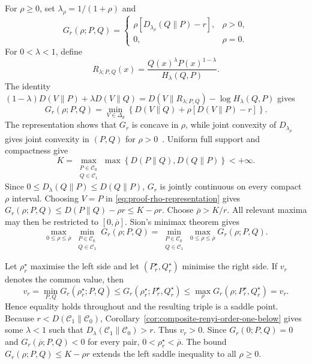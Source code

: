\documentclass[journal,10pt,draftclsnofoot,onecolumn]{IEEEtran}
\begin{document}
\begin{IEEEproof}
For $\rho\geq0$, set $ \lambda_\rho=1/(1+\rho)$ and
\begin{equation*}
G_r(\rho;P,Q)=
\begin{cases}
\rho\left[ D_{\lambda_\rho}(Q\|P)-r \right], & \rho>0, \\ 0, & \rho=0.
\end{cases}
\end{equation*}
For $0<\lambda<1$, define
\begin{equation*} 
R_{\lambda;P,Q}(x) = \frac{ Q(x)^\lambda P(x)^{1-\lambda} }{ H_\lambda(Q,P) }.
\end{equation*}
The identity $ (1-\lambda)D(V\|P) + \lambda D(V\|Q) = D(V\|R_{\lambda;P,Q}) - \log H_\lambda(Q,P) $ gives
\begin{equation} 
G_r(\rho;P,Q) = \min_{V\in\Delta_d} \left\{ D(V\|Q) + \rho \left[ D(V\|P)-r \right] \right\}.
\label{eq:proof-rho-representation}
\end{equation} 
The representation shows that $G_r$ is concave in $\rho$, while joint convexity of $D_{\lambda_\rho}$ gives joint convexity in $(P,Q)$ for $\rho>0$~\cite[Th.~11]{van2014renyi}. Uniform full support and compactness give
\begin{equation*} 
K = \max_{\substack{P\in\mathcal C_0\\Q\in\mathcal C_1}} \max \left\{ D(P\|Q), D(Q\|P) \right\} <+\infty.
\end{equation*}
Since $0\leq D_\lambda(Q\|P)\leq D(Q\|P)$, $G_r$ is jointly continuous on every compact $\rho$ interval. Choosing $V=P$ in \eqref{eq:proof-rho-representation} gives $G_r(\rho;P,Q) \leq D(P\|Q)-\rho r \leq K-\rho r.$ Choose $\overline\rho>K/r$. All relevant maxima may then be restricted to $[0,\overline\rho]$. Sion's minimax theorem gives
\begin{equation} 
\max_{0\leq\rho\leq\overline\rho} \min_{\substack{P\in\mathcal C_0\\Q\in\mathcal C_1}} G_r(\rho;P,Q) = \min_{\substack{P\in\mathcal C_0\\Q\in\mathcal C_1}} \max_{0\leq\rho\leq\overline\rho} G_r(\rho;P,Q).
\label{eq:proof-minimax-interchange}
\end{equation}

Let $\rho_r^\star$ maximise the left side and let $(P_r^\star,Q_r^\star)$ minimise the right side. If $v_r$ denotes the common value, then
\begin{equation*} 
v_r = \min_{P,Q} G_r(\rho_r^\star;P,Q) \leq G_r(\rho_r^\star;P_r^\star,Q_r^\star) \leq \max_\rho G_r(\rho;P_r^\star,Q_r^\star) = v_r.
\end{equation*}
Hence equality holds throughout and the resulting triple is a saddle point. Because $r<D(\mathcal C_1\|\mathcal C_0)$, Corollary~\ref{cor:composite-renyi-order-one-below} gives some $\lambda<1$ such that $D_\lambda(\mathcal C_1\|\mathcal C_0)>r.$ Thus $v_r>0$. Since $G_r(0;P,Q)=0$ and $G_r(\overline\rho;P,Q)<0$ for every pair,
$ 0<\rho_r^\star<\overline\rho.$ The bound $G_r(\rho;P,Q)\leq K-\rho r$ extends the left saddle inequality to all $\rho\geq0$.


\end{IEEEproof}
\end{document}

